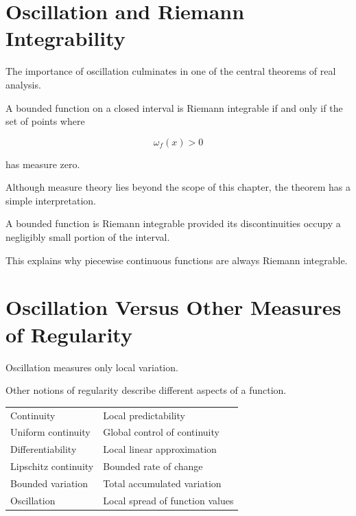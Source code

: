 \documentclass{essay}
\begin{document}

\section{Oscillation and Riemann Integrability}

The importance of oscillation culminates in one of the central theorems of real
analysis.

\begin{theorem}

  A bounded function on a closed interval is Riemann integrable if and only if the
  set of points where

  \[ \omega_{f}(x)>0 \]

  has measure zero.

\end{theorem}

Although measure theory lies beyond the scope of this chapter, the theorem has a
simple interpretation.

A bounded function is Riemann integrable provided its discontinuities occupy a
negligibly small portion of the interval.

This explains why piecewise continuous functions are always Riemann integrable.


\section{Oscillation Versus Other Measures of Regularity}

Oscillation measures only local variation.

Other notions of regularity describe different aspects of a function.

\begin{center}
  \begin{tabular}{ll}
    Continuity & Local predictability\\
    Uniform continuity & Global control of continuity\\
    Differentiability & Local linear approximation\\
    Lipschitz continuity & Bounded rate of change\\
    Bounded variation & Total accumulated variation\\
    Oscillation & Local spread of function values
  \end{tabular}
\end{center}
\end{document}
